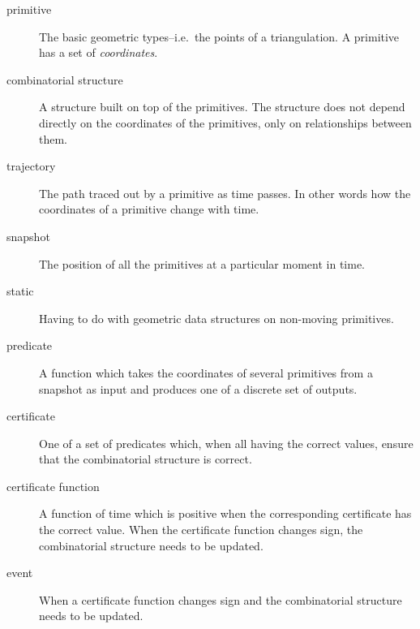 \begin{description}
\item[primitive] The basic geometric types--i.e.\ the points of a
  triangulation. A primitive has a set of {\em coordinates}.
\item[combinatorial structure] A structure built on top of the
  primitives. The structure does not depend directly on the
  coordinates of the primitives, only on relationships between them.
\item[trajectory] The path traced out by a primitive as time passes.
  In other words how the coordinates of a primitive change with time.
\item[snapshot] The position of all the primitives at a particular
  moment in time.
\item[static] Having to do with geometric data structures on
  non-moving primitives.
\item[predicate] A function which takes the coordinates of several
  primitives from a snapshot as input and produces one of a discrete
  set of outputs.
\item[certificate] One of a set of predicates which, when all having
  the correct values, ensure that the combinatorial structure is
  correct.
\item[certificate function] A function of time which is positive when
  the corresponding certificate has the correct value. When the
  certificate function changes sign, the combinatorial structure needs
  to be updated.
\item[event] When a certificate function changes sign and the
  combinatorial structure needs to be updated.
\end{description}












